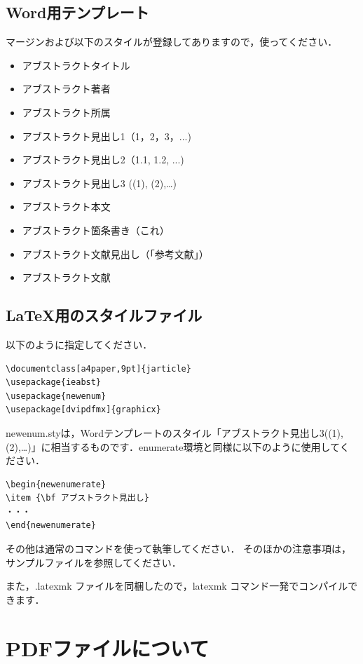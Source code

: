 \documentclass[a4paper, 9pt]{jarticle}
\begin{document}
\begin{論文概要}
\subsection{Word用テンプレート}
マージンおよび以下のスタイルが登録してありますので，使ってください．
\begin{itemize}
\item アブストラクトタイトル
\item アブストラクト著者
\item アブストラクト所属
\item アブストラクト見出し1（1，2，3，...)
\item アブストラクト見出し2（1.1, 1.2, ...)
\item アブストラクト見出し3 ((1), (2),…)
\item アブストラクト本文
\item アブストラクト箇条書き（これ）
\item アブストラクト文献見出し（「参考文献」）
\item アブストラクト文献
\end{itemize}

\subsection{\LaTeX 用のスタイルファイル}
以下のように指定してください．

\begin{verbatim}
\documentclass[a4paper,9pt]{jarticle}
\usepackage{ieabst}
\usepackage{newenum}
\usepackage[dvipdfmx]{graphicx}
\end{verbatim}

newenum.styは，Wordテンプレートのスタイル「アブストラクト見出し3((1), (2),…)」に相当するものです．enumerate環境と同様に以下のように使用してください．
\begin{verbatim}
\begin{newenumerate}
\item {\bf アブストラクト見出し}
・・・
\end{newenumerate}
\end{verbatim}

その他は通常のコマンドを使って執筆してください．
そのほかの注意事項は，サンプルファイルを参照してください．

また，.latexmk ファイルを同梱したので，latexmk コマンド一発でコンパイルできます．

\section{PDFファイルについて}


\end{論文概要}
\end{document}
